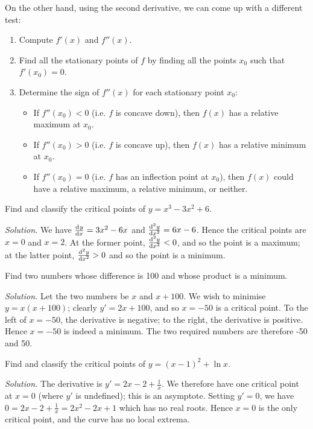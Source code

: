 On the other hand, using the second derivative, we can come up with a different test:
\begin{enumerate}
  \item Compute $ f'(x) $ and $ f''(x) $.
  \item Find all the stationary points of $ f $ by finding all the points $ x_0 $ such that $ f'(x_0) = 0 $.
  \item Determine the sign of $ f''(x) $ for each stationary point $ x_0 $:
    \begin{itemize}
      \item If $ f''(x_0) < 0 $ (i.e. $ f $ is concave down), then $ f(x) $ has a relative maximum at $ x_0 $.
      \item If $ f''(x_0) > 0 $ (i.e. $ f $ is concave up), then $ f(x) $ has a relative minimum at $ x_0 $.
      \item If $ f''(x_0) = 0 $ (i.e. $ f $ has an inflection point at $ x_0 $), then $ f(x) $ could have a relative maximum, a relative minimum, or neither.
    \end{itemize}
\end{enumerate}

\begin{ex}
  Find and classify the critical points of $ y = x^3 - 3x^2 + 6 $.

  \textit{Solution.} We have $ \od{y}{x} = 3x^2 - 6x $ and $ \od[2]{y}{x} = 6x - 6 $. Hence
                     the critical points are $ x = 0 $ and $ x = 2 $. At the former point, $ \od[2]{y}{x} < 0 $,
                     and so the point is a maximum; at the latter point, $ \od[2]{y}{x} > 0 $ and so the point is
                     a minimum.
\end{ex}

\begin{ex}
  Find two numbers whose difference is 100 and whose product is a minimum.

  \textit{Solution.} Let the two numbers be $ x $ and $ x + 100 $. We wish to minimise $ y = x(x + 100) $;
  clearly $ y' = 2x + 100 $, and so $ x = -50 $ is a critical point. To the left of $ x = -50 $, the derivative
  is negative; to the right, the derivative is positive. Hence $ x = -50 $ is indeed a minimum. The two required
  numbers are therefore -50 and 50.
\end{ex}

\begin{ex}
  Find and classify the critical points of $ y = (x - 1)^2 + \ln x $.

  \textit{Solution.} The derivative is $ y' = 2x - 2 + \frac{1}{x} $. We therefore have one critical
  point at $ x = 0 $ (where $ y' $ is undefined); this is an asymptote.
  Setting $ y' = 0 $, we have $ 0 = 2x - 2 + \frac{1}{x} = 2x^2 - 2x + 1 $ which has no real roots. Hence $ x = 0 $ is
  the only critical point, and the curve has no local extrema.
\end{ex}

